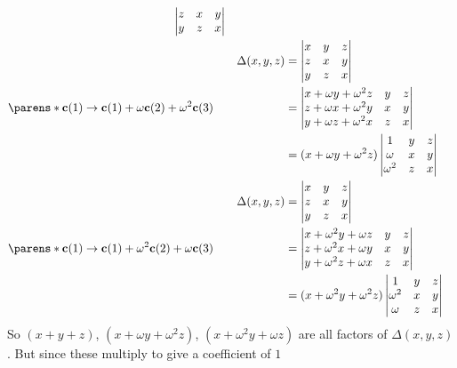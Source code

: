 \documentclass[fleqn,a4paper,11pt]{article}
\begin{document}
\begin{enumerate}[label=\textbf{\arabic*.}]
\begin{alignat*}
\begin{vmatrix}
     z & x & y \\
     y & z & x
    \end{vmatrix} \\
    && \Delta(x, y, z) &= \begin{vmatrix}
     x & y & z \\
     z & x & y \\
     y & z & x
    \end{vmatrix} \\
    \parens*{
     \vec c(1) \to \vec c(1) + \omega \vec c(2) + \omega^2 \vec c(3)
    } \quad
    && &= \begin{vmatrix}
     x + \omega y + \omega^2 z & y & z \\
     z + \omega x + \omega^2 y & x & y \\
     y + \omega z + \omega^2 x & z & x
    \end{vmatrix} \\
    && &= (x + \omega y + \omega^2 z)\begin{vmatrix}
     1 & y & z \\
     \omega & x & y \\
     \omega^2 & z & x
    \end{vmatrix} \\
    && \Delta(x, y, z) &= \begin{vmatrix}
     x & y & z \\
     z & x & y \\
     y & z & x
    \end{vmatrix} \\
    \parens*{
     \vec c(1) \to \vec c(1) + \omega^2 \vec c(2) + \omega \vec c(3)
    } \quad
    && &= \begin{vmatrix}
     x + \omega^2 y + \omega z & y & z \\
     z + \omega^2 x + \omega y & x & y \\
     y + \omega^2 z + \omega x & z & x
    \end{vmatrix} \\
    && &= (x + \omega^2 y + \omega^2 z)\begin{vmatrix}
     1 & y & z \\
     \omega^2 & x & y \\
     \omega & z & x
    \end{vmatrix}
   \end{alignat*}
   So \((x + y + z)\), \((x + \omega y + \omega^2 z)\),
   \((x + \omega^2 y + \omega z)\) are all factors of
   \(\Delta(x, y, z)\). But since these multiply to give a coefficient of \(1\)

\end{enumerate}
\end{document}
